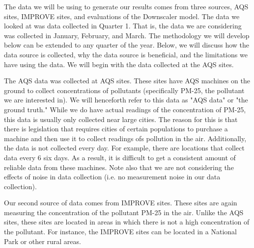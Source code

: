 The data we will be using to generate our results comes from three sources, AQS sites, IMPROVE sites, and evaluations of the Downscaler model.  The data we looked at was data collected in Quarter 1.  That is, the data we are considering was collected in January, February, and March.  The methodology we will develop below can be extended to any quarter of the year.  Below, we will discuss how the data source is collected, why the data source is beneficial, and the limitations we have using the data.  We will begin with the data collected at the AQS sites.  

The AQS data was collected at AQS sites.  These sites have AQS machines on the ground to collect concentrations of pollutants (specifically PM-25, the pollutant we are interested in).  We will henceforth refer to this data as "AQS data" or "the ground truth."  While we do have actual readings of the concentration of PM-25, this data is usually only collected near large cities.  The reason for this is that there is legislation that requires cities of certain populations to purchase a machine and then use it to collect readings ofs pollution in the air.  Additionally, the data is not collected every day.  For example, there are locations that collect data every 6 six days.  As a result, it is difficult to get a consistent amount of reliable data from these machines.  Note also that we are not considering the effects of noise in data collection (i.e. no measurement noise in our data collection).

Our second source of data comes from IMPROVE sites.  These sites are again measuring the concentration of the pollutant PM-25 in the air.  Unlike the AQS sites, these sites are located in areas in which there is not a high concentration of the pollutant.  For instance, the IMPROVE sites can be located in a National Park or other rural areas.

